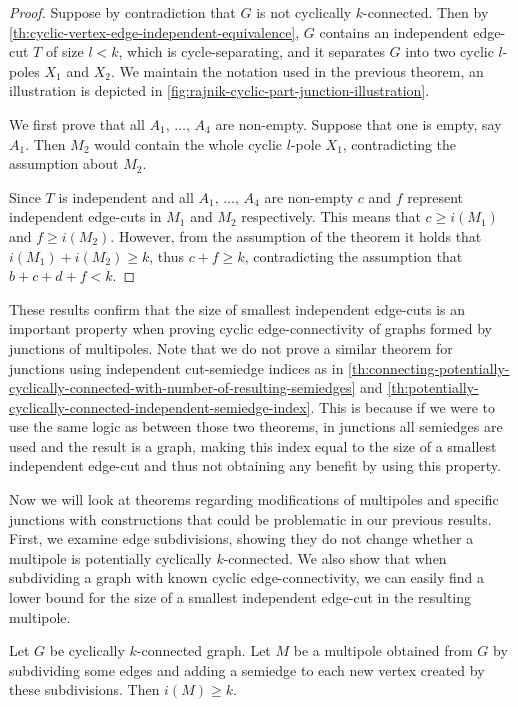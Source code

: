 \documentclass[12pt, twoside]{book}
\begin{document}
\begin{proof}
	Suppose by contradiction that $G$ is not cyclically $k$-connected. Then by \cref{th:cyclic-vertex-edge-independent-equivalence}, $G$ contains an independent edge-cut $T$ of size $l<k$, which is cycle-separating, and it separates $G$ into two cyclic $l$-poles $X_1$ and $X_2$. We maintain the notation used in the previous theorem, an illustration is depicted in \cref{fig:rajnik-cyclic-part-junction-illustration}.
	
	We first prove that all $A_1,\,\dots,\,A_4$ are non-empty. Suppose that one is empty, say $A_1$. Then $M_2$ would contain the whole cyclic $l$-pole $X_1$, contradicting the assumption about $M_2$.
	
	Since $T$ is independent and all $A_1,\,\dots,\,A_4$ are non-empty $c$ and $f$ represent independent edge-cuts in $M_1$ and $M_2$ respectively. This means that ${c\geq i(M_1)}$ and ${f\geq i(M_2)}$. However, from the assumption of the theorem it holds that ${i(M_1)+i(M_2)\geq k}$, thus ${c+f\geq k}$, contradicting the assumption that ${b+c+d+f<k}$.
\end{proof}

These results confirm that the size of smallest independent edge-cuts is an important property when proving cyclic edge-connectivity of graphs formed by junctions of multipoles. Note that we do not prove a similar theorem for junctions using independent cut-semiedge indices as in \cref{th:connecting-potentially-cyclically-connected-with-number-of-resulting-semiedges} and \cref{th:potentially-cyclically-connected-independent-semiedge-index}. This is because if we were to use the same logic as between those two theorems, in junctions all semiedges are used and the result is a graph, making this index equal to the size of a smallest independent edge-cut and thus not obtaining any benefit by using this property.

Now we will look at theorems regarding modifications of multipoles and specific junctions with constructions that could be problematic in our previous results. First, we examine edge subdivisions, showing they do not change whether a multipole is potentially cyclically $k$-connected. We also show that when subdividing a graph with known cyclic edge-connectivity, we can easily find a lower bound for the size of a smallest independent edge-cut in the resulting multipole.

\begin{lemma}\label{lem:subdivisions-smallest-independent-cut}
	Let $G$ be cyclically $k$-connected graph. Let $M$ be a multipole obtained from $G$ by subdividing some edges and adding a semiedge to each new vertex created by these subdivisions. Then $i(M)\geq k$.
\end{lemma}
\end{document}
